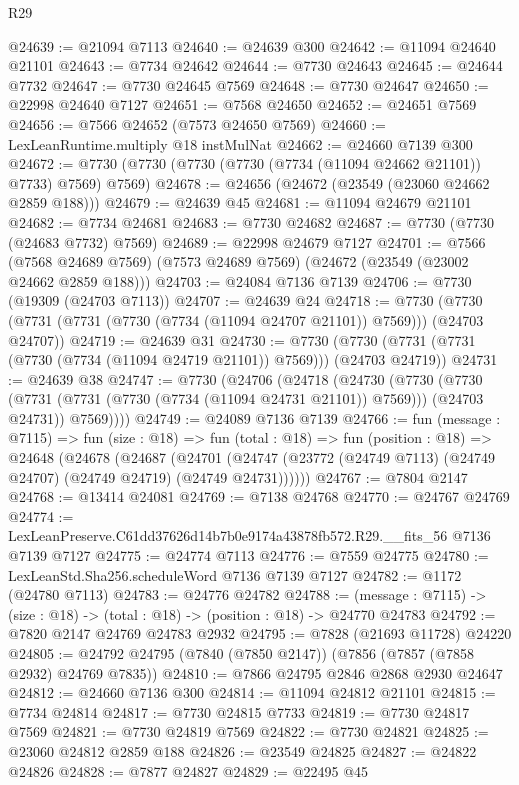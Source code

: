 \begin{lexlean}{R29}
\begin{coremodule}
@24639 := @21094 @7113
@24640 := @24639 @300
@24642 := @11094 @24640 @21101
@24643 := @7734 @24642
@24644 := @7730 @24643
@24645 := @24644 @7732
@24647 := @7730 @24645 @7569
@24648 := @7730 @24647
@24650 := @22998 @24640 @7127
@24651 := @7568 @24650
@24652 := @24651 @7569
@24656 := @7566 @24652 (@7573 @24650 @7569)
@24660 := LexLeanRuntime.multiply @18 instMulNat
@24662 := @24660 @7139 @300
@24672 := @7730 (@7730 (@7730 (@7730 (@7734 (@11094 @24662 @21101)) @7733) @7569) @7569)
@24678 := @24656 (@24672 (@23549 (@23060 @24662 @2859 @188)))
@24679 := @24639 @45
@24681 := @11094 @24679 @21101
@24682 := @7734 @24681
@24683 := @7730 @24682
@24687 := @7730 (@7730 (@24683 @7732) @7569)
@24689 := @22998 @24679 @7127
@24701 := @7566
    (@7568 @24689 @7569)
    (@7573 @24689 @7569)
    (@24672 (@23549 (@23002 @24662 @2859 @188)))
@24703 := @24084 @7136 @7139
@24706 := @7730 (@19309 (@24703 @7113))
@24707 := @24639 @24
@24718 := @7730 (@7730 (@7731 (@7731 (@7730 (@7734 (@11094 @24707 @21101)) @7569))) (@24703 @24707))
@24719 := @24639 @31
@24730 := @7730 (@7730 (@7731 (@7731 (@7730 (@7734 (@11094 @24719 @21101)) @7569))) (@24703 @24719))
@24731 := @24639 @38
@24747 := @7730
    (@24706
      (@24718
        (@24730
          (@7730
            (@7730 (@7731 (@7731 (@7730 (@7734 (@11094 @24731 @21101)) @7569))) (@24703 @24731))
            @7569))))
@24749 := @24089 @7136 @7139
@24766 := fun (message : @7115) =>
  fun (size : @18) =>
  fun (total : @18) =>
  fun (position : @18) =>
  @24648
    (@24678
      (@24687
        (@24701 (@24747 (@23772 (@24749 @7113) (@24749 @24707) (@24749 @24719) (@24749 @24731))))))
@24767 := @7804 @2147
@24768 := @13414 @24081
@24769 := @7138 @24768
@24770 := @24767 @24769
@24774 := LexLeanPreserve.C61dd37626d14b7b0e9174a43878fb572.R29.__fits_56 @7136 @7139 @7127
@24775 := @24774 @7113
@24776 := @7559 @24775
@24780 := LexLeanStd.Sha256.scheduleWord @7136 @7139 @7127
@24782 := @1172 (@24780 @7113)
@24783 := @24776 @24782
@24788 := (message : @7115) -> (size : @18) -> (total : @18) -> (position : @18) -> @24770 @24783
@24792 := @7820 @2147 @24769 @24783 @2932
@24795 := @7828 (@21693 @11728) @24220
@24805 := @24792 @24795 (@7840 (@7850 @2147)) (@7856 (@7857 (@7858 @2932) @24769 @7835))
@24810 := @7866 @24795 @2846 @2868 @2930 @24647
@24812 := @24660 @7136 @300
@24814 := @11094 @24812 @21101
@24815 := @7734 @24814
@24817 := @7730 @24815 @7733
@24819 := @7730 @24817 @7569
@24821 := @7730 @24819 @7569
@24822 := @7730 @24821
@24825 := @23060 @24812 @2859 @188
@24826 := @23549 @24825
@24827 := @24822 @24826
@24828 := @7877 @24827
@24829 := @22495 @45

\end{coremodule}
\end{lexlean}
